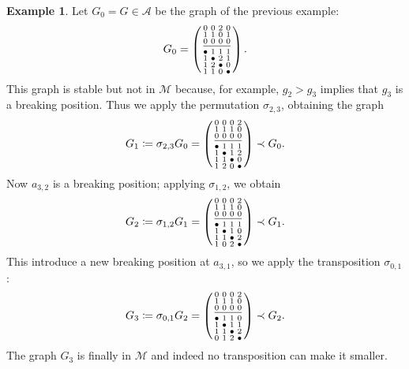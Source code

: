 \documentclass{amsart}
\theoremstyle{plain}
\theoremstyle{definition}
\newtheorem{example}[theorem]{Example}
\newcommand{\psm}[1]{\left(\begin{smallmatrix}#1\end{smallmatrix}\right)}
\begin{document}
\begin{example}
  Let $G_0 = G \in \mathcal{A}$ be the graph of the previous
  example:
  \[
  G_0 = \psm{
    0 & 0 & 2 & 0\\
    1 & 1 & 0 & 1\\
    0 & 0 & 0 & 0\\[2pt]
    \hline\\[1pt]
    \bullet & 1 & 1 & 1\\
    1 &\bullet & 2 & 1\\
    1 & 2 & \bullet & 0\\
    1 & 1 & 0 & \bullet
  }\text{.}
  \]
  This graph is stable but not in $\mathcal{M}$ because, for example,
  $g_2 > g_3$ implies that $g_3$ is a breaking position. Thus we apply
  the permutation $\sigma_{2,3}$, obtaining the graph
  \[
  G_1 \coloneqq \sigma_{2,3} G_0 = \psm{
    0 & 0 & 0 & 2\\
    1 & 1 & 1 & 0\\
    0 & 0 & 0 & 0\\[2pt]
    \hline\\[1pt]
    \bullet & 1 & 1 & 1\\
    1 & \bullet & 1 & 2\\
    1 & 1 & \bullet & 0\\
    1 & 2 & 0 & \bullet
  } \prec G_0\text{.}
  \]
  Now $a_{3,2}$ is a breaking position; applying $\sigma_{1,2}$, we
  obtain
  \[
  G_2 \coloneqq \sigma_{1,2} G_1 = \psm{
    0 & 0 & 0 & 2\\
    1 & 1 & 1 & 0\\
    0 & 0 & 0 & 0\\[2pt]
    \hline\\[1pt]
    \bullet & 1 & 1 & 1\\
    1 & \bullet & 1 & 0\\
    1 & 1 & \bullet & 2\\
    1 & 0 & 2 & \bullet
  } \prec G_1\text{.}
  \]
  This introduce a new breaking position at $a_{3,1}$, so we apply the
  transposition $\sigma_{0,1}$:
  \[
  G_3 \coloneqq \sigma_{0,1} G_2 = \psm{
    0 & 0 & 0 & 2\\
    1 & 1 & 1 & 0\\
    0 & 0 & 0 & 0\\[2pt]
    \hline\\[1pt]
    \bullet & 1 & 1 & 0\\
    1 & \bullet & 1 & 1\\
    1 & 1 & \bullet & 2\\
    0 & 1 & 2 & \bullet
  } \prec G_2\text{.}
  \]
  The graph $G_3$ is finally in $\mathcal{M}$ and indeed no
  transposition can make it smaller.
\end{example}
\end{document}
